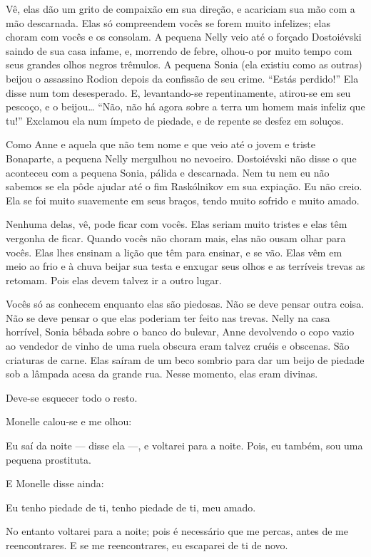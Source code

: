 Vê, elas dão um grito de compaixão em sua direção, e acariciam sua
mão com a mão descarnada. Elas só compreendem vocês se forem muito
infelizes; elas choram com vocês e os consolam. A pequena Nelly veio até o
forçado Dostoiévski saindo de sua casa infame, e, morrendo de febre,
olhou-o por muito tempo com seus grandes olhos negros trêmulos. A pequena
Sonia (ela existiu como as outras) beijou o assassino Rodion depois da
confissão de seu crime. “Estás perdido!” Ela disse num tom desesperado.
E, levantando-se repentinamente, atirou-se em seu pescoço, e o beijou\ldots{}
“Não, não há agora sobre a terra um homem mais infeliz que tu!” Exclamou
ela num ímpeto de piedade, e de repente se desfez em soluços.

Como Anne e aquela que não tem nome e que veio até o jovem e triste
Bonaparte, a pequena Nelly mergulhou no nevoeiro. Dostoiévski não disse o
que aconteceu com a pequena Sonia, pálida e descarnada. Nem tu nem eu não
sabemos se ela pôde ajudar até o fim Raskólnikov em sua expiação. Eu não
creio. Ela se foi muito suavemente em seus braços, tendo muito sofrido e
muito amado.

Nenhuma delas, vê, pode ficar com vocês. Elas seriam muito tristes e
elas têm vergonha de ficar. Quando vocês não choram mais, elas não ousam
olhar para vocês. Elas lhes ensinam a lição que têm para ensinar, e se vão.
Elas vêm em meio ao frio e à chuva beijar sua testa e enxugar seus olhos e as
terríveis trevas as retomam. Pois elas devem talvez ir a outro lugar.

Vocês só as conhecem enquanto elas são piedosas. Não se deve pensar outra
coisa. Não se deve pensar o que elas poderiam ter feito nas trevas. Nelly
na casa horrível, Sonia bêbada sobre o banco do bulevar, Anne devolvendo
o copo vazio ao vendedor de vinho de uma ruela obscura eram talvez cruéis
e obscenas. São criaturas de carne. Elas saíram de um beco sombrio para
dar um beijo de piedade sob a lâmpada acesa da grande rua. Nesse momento,
elas eram divinas.

Deve-se esquecer todo o resto.

Monelle calou-se e me olhou:

Eu saí da noite --- disse ela ---, e voltarei para a noite. Pois, eu também,
sou uma pequena prostituta.

E Monelle disse ainda:

Eu tenho piedade de ti, tenho piedade de ti, meu amado.

No entanto voltarei para a noite; pois é necessário que me percas,
antes de me reencontrares. E se me reencontrares, eu escaparei de ti de novo.

